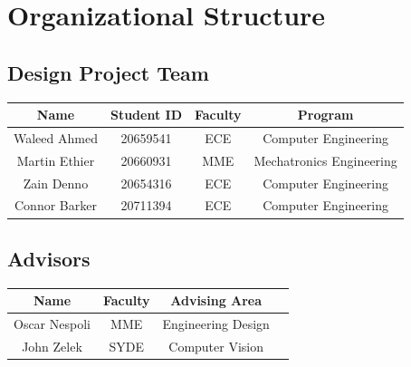 \documentclass[a4paper,11pt]{article}
\begin{document}
\section{Organizational Structure}
\subsection{Design Project Team}
\setlength{\tabcolsep}{1em}
\begin{table}[ht]
    \centering
    \begin{tabular}{|c|c|c|c|}
        \hline
        Name & Student ID & Faculty & Program\\ \hline
        Waleed Ahmed & 20659541 & ECE & Computer Engineering \\ \hline
        Martin Ethier & 20660931 & MME & Mechatronics Engineering \\ \hline
        Zain Denno & 20654316 & ECE & Computer Engineering \\ \hline
        Connor Barker & 20711394 & ECE & Computer Engineering \\ \hline
    \end{tabular}
    \label{Team}
\end{table}

\newpage

\subsection{Advisors}
\begin{table}[ht]
    \centering
    \begin{tabular}{|c|c|c|c|}
        \hline
        Name & Faculty & Advising Area\\ \hline
        Oscar Nespoli & MME & Engineering Design \\ \hline
        John Zelek & SYDE & Computer Vision \\ \hline
    \end{tabular}
    \label{Advisors}
\end{table}
\end{document}
